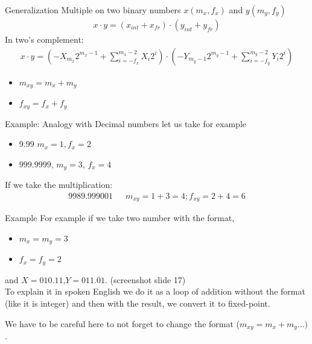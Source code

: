 \begin{parag}{Generalization}
    Multiple on two binary numbers $x(m_x, f_x)$ and $y(m_y, f_y)$
    \begin{align*}
        x \cdot y = (x_{int} + x_{fr} ) \cdot (y_{int} + y_{fr})
    \end{align*}
    In two's complement:
    \begin{align*}
        x \cdot y = \left( -X_{m_x} 2^{m_x - 1} + \sum_{i=-f_x}^{m_x - 2} X_i 2^i \right) \cdot \left( -Y_{m_y- 1}2^{m_y - 1} + \sum_{i = -f_y}^{m_y-2} Y_i 2^i \right)
    \end{align*}
    \begin{itemize}
        \item $m_{xy} = m_x + m_y$
    \item $f_{xy} = f_x + f_y$

    \end{itemize}
    \begin{subparag}{Example: Analogy with Decimal numbers}
        let us take for example 
        \begin{itemize}
            \item $9.99$ $m_x = 1, f_x = 2$
            \item $999.9999$, $m_y = 3$, $f_x = 4$
        \end{itemize}
        If we take the multiplication:
        \begin{align*}
            9989.999001 \text{ } \; \; \; m_{xy} = 1 + 3 = 4; f_{xy} = 2 + 4 = 6
        \end{align*}
    \end{subparag}
    \begin{subparag}{Example}
        For example if we take two number with the format, 
        \begin{itemize}
            \item $m_x = m_y = 3$ 
            \item $f_x = f_y = 2$
        \end{itemize}
    and $X = 010.11$,$Y = 011.01$. (screenshot slide 17)
    \\
    To explain it in spoken English we do it as a loop of addition without the format (like it is integer) and then with the result, we convert it to fixed-point.
    \begin{framedremark}
        We have to be careful here to not forget to change the format ($m_{xy} = m_x + m_y \dots)$.
    \end{framedremark}
    \end{subparag}
\end{parag}

